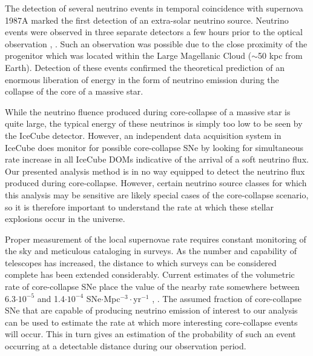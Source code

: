 \documentclass{gatech-thesis}
\begin{document}
The detection of several neutrino events in temporal coincidence with supernova 1987A marked the first detection of an extra-solar neutrino source. Neutrino events were observed in three separate detectors a few hours prior to the optical observation \cite{1987PhRvL..58.1490H}, \cite{1987PhRvL..58.1494B}. Such an observation was possible due to the close proximity of the progenitor which was located within the Large Magellanic Cloud ($\sim$50 kpc from Earth). Detection of these events confirmed the theoretical prediction of an enormous liberation of energy in the form of neutrino emission during the collapse of the core of a massive star.

While the neutrino fluence produced during core-collapse of a massive star is quite large, the typical energy of these neutrinos is simply too low to be seen by the IceCube detector. However, an independent data acquisition system in IceCube does monitor for possible core-collapse SNe by looking for simultaneous rate increase in all IceCube DOMs indicative of the arrival of a soft neutrino flux. Our presented analysis method is in no way equipped to detect the neutrino flux produced during core-collapse. However, certain neutrino source classes for which this analysis may be sensitive are likely special cases of the core-collapse scenario, so it is therefore important to understand the rate at which these stellar explosions occur in the universe. 

Proper measurement of the local supernovae rate requires constant monitoring of the sky and meticulous cataloging in surveys. As the number and capability of telescopes has increased, the distance to which surveys can be considered complete has been extended considerably. Current estimates of the volumetric rate of core-collapse SNe place the value of the nearby rate somewhere between 6.3$\cdot10^{-5}$ and 1.4$\cdot10^{-4}$ SNe$\cdot$Mpc$^{-3}\cdot$yr$^{-1}$ \cite{2011MNRAS.412.1419L}, \cite{0004-637X-738-2-154}. The assumed fraction of core-collapse SNe that are capable of producing neutrino emission of interest to our analysis can be used to estimate the rate at which more interesting core-collapse events will occur. This in turn gives an estimation of the probability of such an event occurring at a detectable distance during our observation period.
\end{document}
